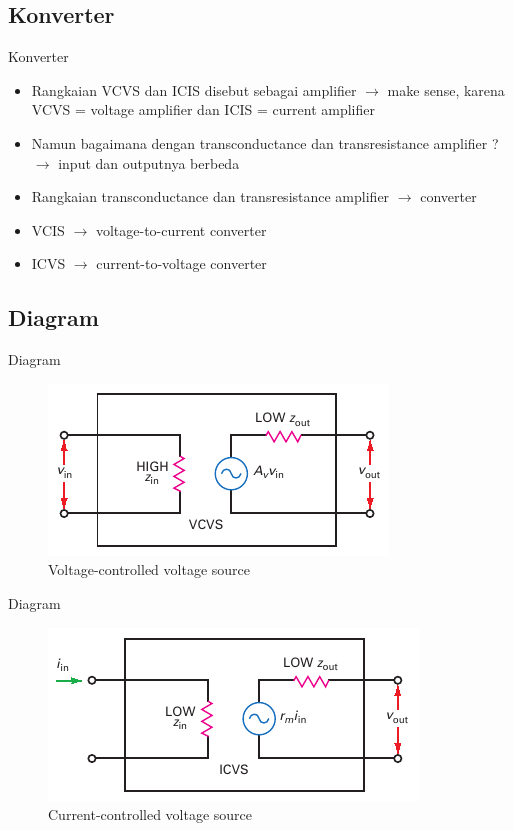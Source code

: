 \subsection{Konverter}
\begin{frame}{Konverter}
	\begin{itemize}
		\item Rangkaian VCVS dan ICIS disebut sebagai amplifier $ \rightarrow $ make sense, karena VCVS = voltage amplifier dan ICIS = current amplifier
		\item Namun bagaimana dengan transconductance dan transresistance amplifier ? $ \rightarrow $ input dan outputnya berbeda
		\item Rangkaian transconductance dan transresistance amplifier $ \rightarrow $ converter
		\item VCIS $\rightarrow$ voltage-to-current converter
		\item ICVS $\rightarrow$ current-to-voltage converter
	\end{itemize}
\end{frame}

\subsection{Diagram}
\begin{frame}{Diagram}
	\begin{figure}
		\centering
		\includegraphics[width=0.7\linewidth]{gambar/fig-17.01a}
		\caption{Voltage-controlled voltage source}
		\label{fig-17.01a}
	\end{figure}
\end{frame}

\begin{frame}{Diagram}
	\begin{figure}
		\centering
		\includegraphics[width=0.7\linewidth]{gambar/fig-17.01b}
		\caption{Current-controlled voltage source}
		\label{fig-17.01b}
	\end{figure}
\end{frame}

